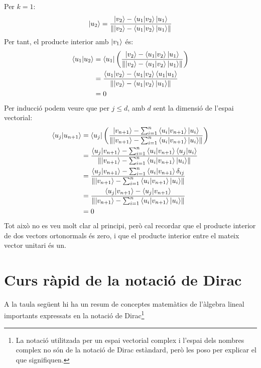 Per $k=1$:
$$
\ket{u_2} = \frac{\ket{v_2} - \bra{u_1}\ket{v_2}\ket{u_1}}{\norm{\ket{v_2} - \bra{u_1}\ket{v_2}\ket{u_1}}}
$$
Per tant, el producte interior amb $\ket{v_1}$ és:
$$
\begin{aligned}
\bra{u_1}\ket{u_2} 
&= \bra{u_1} \left( \frac{\ket{v_2} - \bra{u_1}\ket{v_2}\ket{u_1}}{\norm{\ket{v_2} - \bra{u_1}\ket{v_2}\ket{u_1}}} \right) \\
&= \frac{\bra{u_1}\ket{v_2} - \bra{u_1}\ket{v_2}\bra{u_1}\ket{u_1}}{\norm{\ket{v_2} - \bra{u_1}\ket{v_2}\ket{u_1}}} \\
&= 0
\end{aligned}
$$
Per inducció podem veure que per $j \leq d$, amb $d$ sent la dimensió de l'espai vectorial:
$$
\begin{aligned}
	\bra{u_j}\ket{u_{n+1}} 
	& = \bra{u_j} \left( \frac{\ket{v_{n+1}} - \sum_{i=1}^{n} \bra{u_i}\ket{v_{n+1}}\ket{u_i}}{\norm{\ket{v_{n+1}} - \sum_{i=1}^{n} \bra{u_i}\ket{v_{n+1}}\ket{u_i}}} \right) \\
	& = \frac{\bra{u_j}\ket{v_{n+1}} - \sum_{i=1}^{n} \bra{u_i}\ket{v_{n+1}} \bra{u_j}\ket{u_i}}{\norm{\ket{v_{n+1}} - \sum_{i=1}^{n} \bra{u_i}\ket{v_{n+1}} \ket{u_i}}} \\
	& = \frac{\bra{u_j}\ket{v_{n+1}} - \sum_{i=1}^{n} \bra{u_i}\ket{v_{n+1}} \delta_{ij}}{\norm{\ket{v_{n+1}} - \sum_{i=1}^{n} \bra{u_i}\ket{v_{n+1}} \ket{u_i}}} \\
	& = \frac{\bra{u_j}\ket{v_{n+1}} - \bra{u_j}\ket{v_{n+1}}}{\norm{\ket{v_{n+1}} - \sum_{i=1}^{n} \bra{u_i}\ket{v_{n+1}} \ket{u_i}}} \\
	& = 0	\\
\end{aligned}
$$
Tot això no es veu molt clar al principi, però cal recordar que el producte interior de dos vectors ortonormals és zero, i que el producte interior entre el mateix vector unitari és un.

\section{Curs ràpid de la notació de Dirac}
A la taula següent hi ha un resum de conceptes matemàtics de l'àlgebra lineal importants expressats en la notació de Dirac\footnote{La notació utilitzada per un espai vectorial complex i l'espai dels nombres complex no són de la notació de Dirac estàndard, però les poso per explicar el que signifiquen.} \cite{QCandQI:dirac_notation}

